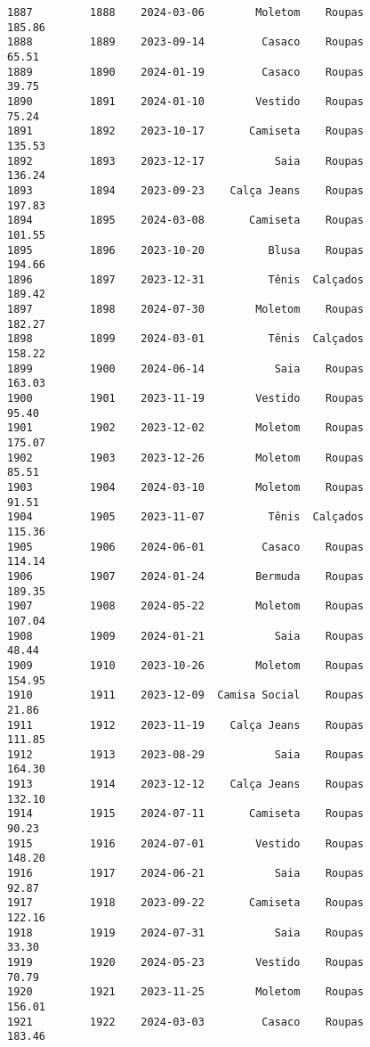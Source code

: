 \documentclass[11pt]{article}
\begin{document}
\begin{Verbatim}[commandchars=\\\{\}]
1887         1888    2024-03-06        Moletom    Roupas          185.86   
1888         1889    2023-09-14         Casaco    Roupas           65.51   
1889         1890    2024-01-19         Casaco    Roupas           39.75   
1890         1891    2024-01-10        Vestido    Roupas           75.24   
1891         1892    2023-10-17       Camiseta    Roupas          135.53   
1892         1893    2023-12-17           Saia    Roupas          136.24   
1893         1894    2023-09-23    Calça Jeans    Roupas          197.83   
1894         1895    2024-03-08       Camiseta    Roupas          101.55   
1895         1896    2023-10-20          Blusa    Roupas          194.66   
1896         1897    2023-12-31          Tênis  Calçados          189.42   
1897         1898    2024-07-30        Moletom    Roupas          182.27   
1898         1899    2024-03-01          Tênis  Calçados          158.22   
1899         1900    2024-06-14           Saia    Roupas          163.03   
1900         1901    2023-11-19        Vestido    Roupas           95.40   
1901         1902    2023-12-02        Moletom    Roupas          175.07   
1902         1903    2023-12-26        Moletom    Roupas           85.51   
1903         1904    2024-03-10        Moletom    Roupas           91.51   
1904         1905    2023-11-07          Tênis  Calçados          115.36   
1905         1906    2024-06-01         Casaco    Roupas          114.14   
1906         1907    2024-01-24        Bermuda    Roupas          189.35   
1907         1908    2024-05-22        Moletom    Roupas          107.04   
1908         1909    2024-01-21           Saia    Roupas           48.44   
1909         1910    2023-10-26        Moletom    Roupas          154.95   
1910         1911    2023-12-09  Camisa Social    Roupas           21.86   
1911         1912    2023-11-19    Calça Jeans    Roupas          111.85   
1912         1913    2023-08-29           Saia    Roupas          164.30   
1913         1914    2023-12-12    Calça Jeans    Roupas          132.10   
1914         1915    2024-07-11       Camiseta    Roupas           90.23   
1915         1916    2024-07-01        Vestido    Roupas          148.20   
1916         1917    2024-06-21           Saia    Roupas           92.87   
1917         1918    2023-09-22       Camiseta    Roupas          122.16   
1918         1919    2024-07-31           Saia    Roupas           33.30   
1919         1920    2024-05-23        Vestido    Roupas           70.79   
1920         1921    2023-11-25        Moletom    Roupas          156.01   
1921         1922    2024-03-03         Casaco    Roupas          183.46   

\end{Verbatim}
\end{document}
